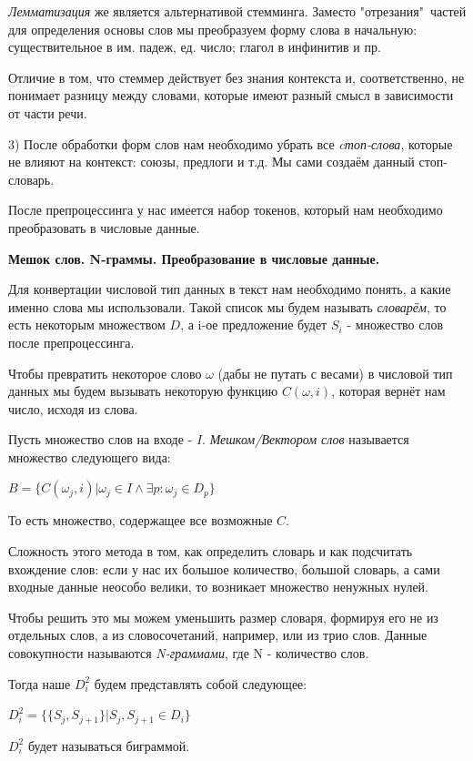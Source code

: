 \documentclass[12pt]{extarticle}
\begin{document}
	\textit{Лемматизация} же является альтернативой стемминга. Заместо "отрезания"\ частей для определения основы слов мы преобразуем форму слова в начальную: существительное в им. падеж, ед. число; глагол в инфинитив и пр.
	
	Отличие в том, что стеммер действует без знания контекста и, соответственно, не понимает разницу между словами, которые имеют разный смысл в зависимости от части речи.
	
	3) После обработки форм слов нам необходимо убрать все \textit{cтоп-слова}, которые не влияют на контекст: союзы, предлоги и т.д. Мы сами создаём данный стоп-словарь. 
	
	После препроцессинга у нас имеется набор токенов, который нам необходимо преобразовать в числовые данные. 
	
	\centerline{\textbf{Мешок слов. N-граммы. 
	Преобразование в числовые данные.}}
	
	Для конвертации числовой тип данных в текст нам необходимо понять, а какие именно слова мы использовали. Такой список мы будем называть \textit{словарём}, то есть некоторым множеством $D$, а i-ое предложение будет $S_i$ - множество слов после препроцессинга. 
	
	Чтобы превратить некоторое слово $\omega$ (дабы не путать с весами) в числовой тип данных мы будем вызывать некоторую функцию $C(\omega, i)$, которая вернёт нам число, исходя из слова. 
	
	
	Пусть множество слов на входе - $I$. \textit{Мешком/Вектором слов} называется множество следующего вида:
	
	\centerline{$B = \{ C(\omega_j, i) | \omega_j \in I \land \exists p: \omega_j \in D_p \} $}
	
	То есть множество, содержащее все возможные $C$. 
	
	Сложность этого метода в том, как определить словарь и как подсчитать вхождение слов: если у нас их большое количество, большой словарь, а сами входные данные неособо велики, то возникает множество ненужных нулей. 
	
	Чтобы решить это мы можем уменьшить размер словаря, формируя его не из отдельных слов, а из словосочетаний, например, или из трио слов. Данные совокупности называются \textit{N-граммами}, где N - количество слов. 
	
	Тогда наше $D^2_i$ будем представлять собой следующее: 
	
	\centerline{$D^2_i = \{\{S_j, S_{j+1} \} | S_j, S_{j+1} \in D_i \}$}  
	
	$D^2_i$ будет называться биграммой.
	
\end{document}
